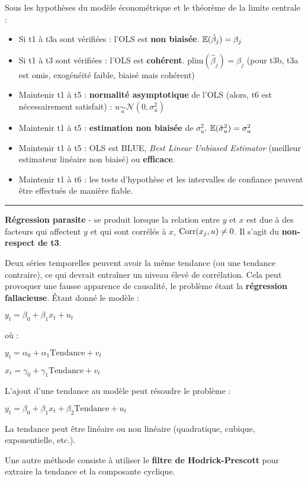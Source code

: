 \begin{f}
	
Sous les hypothèses du modèle économétrique et le théorème de la limite centrale :

\begin{itemize}[leftmargin=*]
	\item Si t1 à t3a sont vérifiées : l'OLS est \textbf{non biaisée}. $\mathbb{E}(\hat{\beta}_{j}) = \beta_{j}$
	\item Si t1 à t3 sont vérifiées : l'OLS est \textbf{cohérent}. $\mathrm{plim}(\hat{\beta}_{j}) = \beta_{j}$ (pour t3b, t3a est omis, exogénéité faible, biaisé mais cohérent)
	\item Maintenir t1 à t5 : \textbf{normalité asymptotique} de l'OLS (alors, t6 est nécessairement satisfait) : $u \underset{a}{\sim}\mathcal{N}(0, \sigma^{2}_{u})$
	\item Maintenir t1 à t5 : \textbf{estimation non biaisée} de $\sigma^{2}_{u}$. $\mathbb{E}(\hat{\sigma}^{2}_{u}) = \sigma^{2}_{u}$
	\item Maintenir t1 à t5 : OLS est \textcolor{BleuProfondIRA}{BLUE, \emph{Best Linear Unbiased Estimator}} (meilleur estimateur linéaire non biaisé) ou \textbf{efficace}.
	\item Maintenir t1 à t6 : les tests d'hypothèse et les intervalles de confiance peuvent être effectués de manière fiable.
\end{itemize}


\end{f}  \hrule

\begin{f}

\textbf{Régression parasite} - se produit lorsque la relation entre $y$ et $x$ est due à des facteurs qui affectent $y$ et qui sont corrélés à $x$, $\mathrm{Corr}(x_{j}, u) \neq 0$. Il s'agit du \textbf {non-respect de t3}.



Deux séries temporelles peuvent avoir la même tendance (ou une tendance contraire), ce qui devrait entraîner un niveau élevé de corrélation. Cela peut provoquer une fausse apparence de causalité, le problème étant la \textbf{régression fallacieuse}. Étant donné le modèle :
%
\begin{center}
	$y_{t} = \beta_{0} + \beta_{1} x_{t} + u_{t}$
\end{center}
où :
\begin{center}
	$y_{t} = \alpha_{0} + \alpha_{1} \mathrm{Tendance} + v_{t}$
	
	$x_{t} = \gamma_{0} + \gamma_{1} \mathrm{Tendance} + v_{t}$
\end{center}
L'ajout d'une tendance au modèle peut résoudre le problème :
\begin{center}
	$y_{t} = \beta_{0} + \beta_{1} x_{t} + \beta_{2} \mathrm{Tendance} + u_{t}$
\end{center}
La tendance peut être linéaire ou non linéaire (quadratique, cubique, exponentielle, etc.).

Une autre méthode consiste à utiliser le \textbf{filtre de Hodrick-Prescott} pour extraire la tendance et la composante cyclique.

\end{f}    

